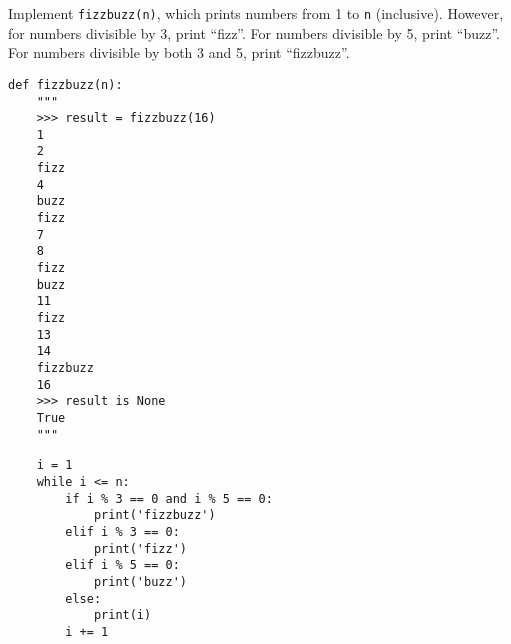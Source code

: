 \begin{blocksection}
\question Implement \lstinline$fizzbuzz(n)$, which prints numbers from 1 to \lstinline$n$
(inclusive). However, for numbers divisible by 3, print ``fizz''. For
numbers divisible by 5, print ``buzz''. For numbers divisible by both 3 and 5,
print ``fizzbuzz''.

\begin{lstlisting}
def fizzbuzz(n):
    """
    >>> result = fizzbuzz(16)
    1
    2
    fizz
    4
    buzz
    fizz
    7
    8
    fizz
    buzz
    11
    fizz
    13
    14
    fizzbuzz
    16
    >>> result is None
    True
    """
\end{lstlisting}
\begin{solution}[2in]
\begin{lstlisting}
    i = 1
    while i <= n:
        if i % 3 == 0 and i % 5 == 0:
            print('fizzbuzz')
        elif i % 3 == 0:
            print('fizz')
        elif i % 5 == 0:
            print('buzz')
        else:
            print(i)
        i += 1
\end{lstlisting}
\end{solution}
\end{blocksection}
